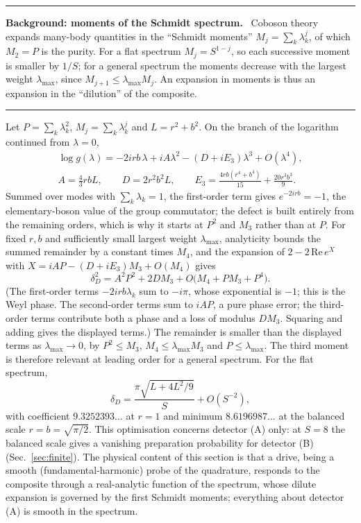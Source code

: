 \documentclass[11pt,a4paper]{article}
\newenvironment{background}[1]{\par\medskip\noindent\hrule\smallskip\noindent\textbf{Background: #1.}\ \ignorespaces}{\par\smallskip\noindent\hrule\medskip}
\begin{document}
\begin{background}{moments of the Schmidt spectrum}
Coboson theory expands many-body quantities in the ``Schmidt moments'' $M_j=\sum_k\lambda_k^j$, of which $M_2=P$ is the purity. For a flat spectrum $M_j=S^{1-j}$, so each successive moment is smaller by $1/S$; for a general spectrum the moments decrease with the largest weight $\lambda_{\max}$, since $M_{j+1}\le\lambda_{\max}M_j$. An expansion in moments is thus an expansion in the ``dilution'' of the composite.
\end{background}

Let $P=\sum_k\lambda_k^2$, $M_j=\sum_k\lambda_k^j$ and $L=r^2+b^2$. On the branch of the logarithm continued from $\lambda=0$,
\begin{equation}
\begin{gathered}
\log g(\lambda)=-2irb\,\lambda+iA\lambda^2-(D+iE_3)\lambda^3+O(\lambda^4),\\
A=\tfrac43 rbL,\qquad D=2r^2b^2L,\qquad E_3=\frac{4rb(r^4+b^4)}{15}+\frac{20r^3b^3}{9}.
\end{gathered}
\label{eq:logg}
\end{equation}
Summed over modes with $\sum_k\lambda_k=1$, the first-order term gives $e^{-2irb}=-1$, the elementary-boson value of the group commutator; the defect is built entirely from the remaining orders, which is why it starts at $P^2$ and $M_3$ rather than at $P$. For fixed $r,b$ and sufficiently small largest weight $\lambda_{\max}$, analyticity bounds the summed remainder by a constant times $M_4$, and the expansion of $2-2\,\mathrm{Re}\,e^{X}$ with $X=iAP-(D+iE_3)M_3+O(M_4)$ gives
\begin{equation}
\delta_D^2=A^2P^2+2DM_3+O\big(M_4+PM_3+P^4\big).
\label{eq:expansion}
\end{equation}
(The first-order terms $-2irb\lambda_k$ sum to $-i\pi$, whose exponential is $-1$; this is the Weyl phase. The second-order terms sum to $iAP$, a pure phase error; the third-order terms contribute both a phase and a loss of modulus $DM_3$. Squaring and adding gives the displayed terms.) The remainder is smaller than the displayed terms as $\lambda_{\max}\to0$, by $P^2\le M_3$, $M_4\le\lambda_{\max}M_3$ and $P\le\lambda_{\max}$. The third moment is therefore relevant at leading order for a general spectrum. For the flat spectrum,
\begin{equation}
\delta_D=\frac{\pi\sqrt{L+4L^2/9}}{S}+O(S^{-2}),
\label{eq:flatdefect}
\end{equation}
with coefficient $9.3252393\ldots$ at $r=1$ and minimum $8.6196987\ldots$ at the balanced scale $r=b=\sqrt{\pi/2}$. This optimisation concerns detector (A) only: at $S=8$ the balanced scale gives a vanishing preparation probability for detector (B) (Sec.~\ref{sec:finite}). The physical content of this section is that a drive, being a smooth (fundamental-harmonic) probe of the quadrature, responds to the composite through a real-analytic function of the spectrum, whose dilute expansion is governed by the first Schmidt moments; everything about detector (A) is smooth in the spectrum.
\end{document}
